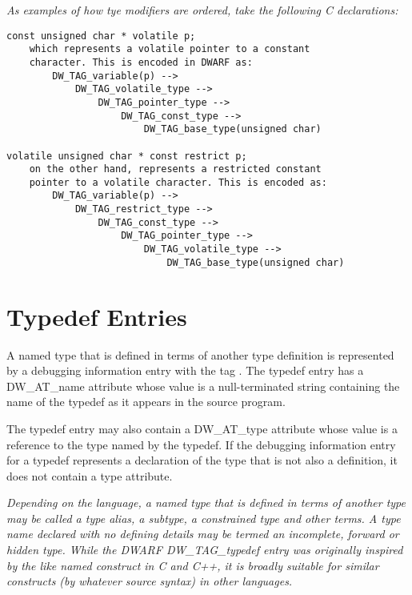 \clearpage
\textit{As examples of how tye modifiers are ordered, take the following C
declarations:}

\begin{verbatim}
const unsigned char * volatile p;
    which represents a volatile pointer to a constant
    character. This is encoded in DWARF as:
        DW_TAG_variable(p) -->
            DW_TAG_volatile_type -->
                DW_TAG_pointer_type -->
                    DW_TAG_const_type -->
                        DW_TAG_base_type(unsigned char)

volatile unsigned char * const restrict p;
    on the other hand, represents a restricted constant
    pointer to a volatile character. This is encoded as:
        DW_TAG_variable(p) -->
            DW_TAG_restrict_type -->
                DW_TAG_const_type -->
                    DW_TAG_pointer_type -->
                        DW_TAG_volatile_type -->
                            DW_TAG_base_type(unsigned char)

\end{verbatim}

\section{Typedef Entries}
\label{chap:typedefentries}
A named type that is defined in terms of another type
definition is represented by a debugging information entry with
the tag . 
The typedef entry has a DW\_AT\_name
attribute whose value is a null-terminated string containing
the name of the typedef as it appears in the source program.

The typedef entry may also contain a DW\_AT\_type attribute whose
value is a reference to the type named by the typedef. If
the debugging information entry for a typedef represents
a declaration of the type that is not also a definition,
it does not contain a type attribute.

\textit{Depending on the language, a named type that is defined in
terms of another type may be called a type alias, a subtype,
a constrained type and other terms. A type name declared with
no defining details may be termed an incomplete, forward
or hidden type. While the DWARF DW\_TAG\_typedef entry was
originally inspired by the like named construct in C and C++,
it is broadly suitable for similar constructs (by whatever
source syntax) in other languages.}

